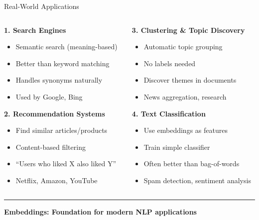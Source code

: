 \documentclass[8pt,aspectratio=169]{beamer}
\newcommand{\bottomnote}[1]{%
\vfill
\vspace{-2mm}
\textcolor{mllavender2}{\rule{\textwidth}{0.4pt}}
\vspace{1mm}
\footnotesize
\textbf{#1}
}
\begin{document}
\begin{frame}[t]{Real-World Applications}

\begin{columns}[t]
\begin{column}{0.48\textwidth}
\textbf{1. Search Engines}
\begin{itemize}
    \item Semantic search (meaning-based)
    \item Better than keyword matching
    \item Handles synonyms naturally
    \item Used by Google, Bing
\end{itemize}

\vspace{0.5cm}

\textbf{2. Recommendation Systems}
\begin{itemize}
    \item Find similar articles/products
    \item Content-based filtering
    \item ``Users who liked X also liked Y''
    \item Netflix, Amazon, YouTube
\end{itemize}
\end{column}

\begin{column}{0.48\textwidth}
\textbf{3. Clustering \& Topic Discovery}
\begin{itemize}
    \item Automatic topic grouping
    \item No labels needed
    \item Discover themes in documents
    \item News aggregation, research
\end{itemize}

\vspace{0.5cm}

\textbf{4. Text Classification}
\begin{itemize}
    \item Use embeddings as features
    \item Train simple classifier
    \item Often better than bag-of-words
    \item Spam detection, sentiment analysis
\end{itemize}
\end{column}
\end{columns}

\bottomnote{Embeddings: Foundation for modern NLP applications}
\end{frame}
\end{document}
